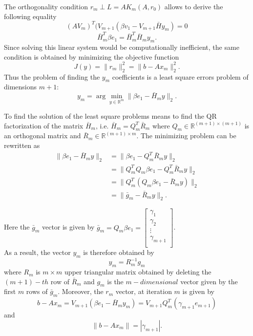 The orthogonality condition $r_m \perp \mathit{L}=A\mathit{K}_m(A,r_0)$ allows to derive the following equality  
\begin{equation}
    (AV_m)^T(V_{m+1}(\beta v_1 - V_{m+1}\bar{H} y_m) = 0
\end{equation}
\begin{equation}
    \bar{H}_m^T \beta e_1 = \bar{H}_m^T \bar{H}_m y_m. 
\end{equation}
Since solving this linear system would be computationally inefficient, the same condition is obtained by minimizing the objective function $$J(y) = \|r_m\|_2^2 = \|b - Ax_m\|_2^2.$$ Thus the problem of finding the $y_m$ coefficients is a least square errors problem of dimensions $m+1$: \begin{equation}
    y_m = \arg\min_{y \in \mathbb{R}^m} \|\beta e_1 - \bar{H}_m y\|_2.
\end{equation}

To find the solution of the least square problems means to find the QR factorization of the matrix $\bar{H}_m$, i.e. $\bar{H}_m = Q_m^T \bar{R}_m$ where $Q_m \in \mathbb{R}^{(m+1) \times (m+1) }$ is an orthogonal matrix and $\bar{R}_m  \in \mathbb{R}^{(m+1) \times m} $. The minimizing problem can be rewritten as 
\begin{equation}\label{eq:leastsquaresolver}
\begin{aligned}
    \|\beta e_1 - \bar{H}_m y\|_2 &= \|\beta e_1 - Q_m^T \bar{R}_m y\|_2 \\
    &= \|Q_m^T Q_m \beta e_1 - Q_m^T \bar{R}_m y\|_2 \\
    &= \|Q_m^T (Q_m \beta e_1 - \bar{R}_m y)\|_2 \\
    &= \|\bar{g}_m - \bar{R}_m y\|_2.
\end{aligned}
\end{equation}

\noindent Here the $\bar{g}_m$ vector is given by $\bar{g}_m = Q_m\beta e_1 = \begin{bmatrix}
\gamma_1 \\
\gamma_2 \\
\vdots \\
\gamma_{m+1} \\
\end{bmatrix} $.\\

\noindent As a result, the vector $y_m$ is therefore obtained by \begin{equation}
    y_m = R_m^{-1} g_m
\end{equation}
where $R_m$ is $m \times m$ upper triangular matrix obtained by deleting the $(m+1)-th$ row of $\bar{R}_m$ and $g_m$ is the $m-dimensional$ vector given by the first $m$ rows of $\bar{g}_m$. Moreover, the $r_m$ vector, at iteration $m$ is given by $$b - Ax_m = V_{m+1}(\beta e_1 - \bar{H}_my_m)= V_{m+1}Q_m^T(\gamma_{m+1} e_{m+1} ) 
$$ and 
\begin{equation} \label{eq_gmres_residual}
    \|b - Ax_m \| = |\gamma_{m+1}|.  
\end{equation}

